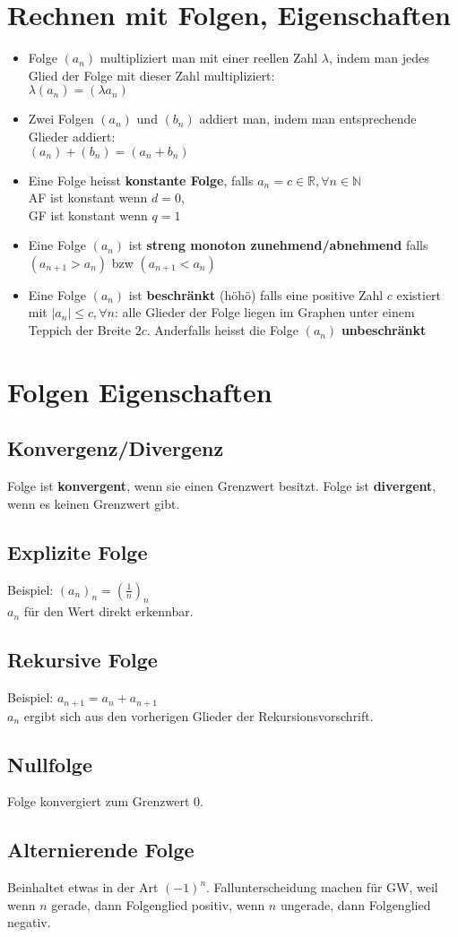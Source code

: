 \documentclass[../main.tex]{subfiles}
\begin{document}
\section{Rechnen mit Folgen, Eigenschaften}
\begin{itemize}
    \item Folge $(a_n)$ multipliziert man mit einer reellen Zahl $\lambda$, indem man jedes Glied der Folge mit dieser Zahl multipliziert: \\ [7pt]
    $\lambda(a_n) = (\lambda a_n)$
    \item Zwei Folgen $(a_n)$ und $(b_n)$ addiert man, indem man entsprechende Glieder addiert: \\ [7pt]
    $(a_n)+(b_n) = (a_n + b_n)$
    \item Eine Folge heisst \textbf{
        konstante Folge}, falls $a_n = c \in \mathbb{R}, \forall n \in \mathbb{N}$ \\
    AF ist konstant wenn $d=0$, \\
    GF ist konstant wenn $q=1$
    \item Eine Folge $(a_n)$ ist \textbf{streng monoton zunehmend/abnehmend} falls $(a_{n+1} > a_n)$ bzw $(a_{n+1} < a_n)$
    \item Eine Folge $(a_n)$ ist \textbf{beschränkt} (höhö) falls eine positive Zahl $c$ existiert mit $|a_n|\leq c, \forall n$: alle Glieder der Folge liegen im Graphen unter einem Teppich der Breite $2c$. Anderfalls heisst die Folge $(a_n)$ \textbf{unbeschränkt}
\end{itemize}


\section{Folgen Eigenschaften}
\subsection{Konvergenz/Divergenz}
Folge ist \textbf{konvergent}, wenn sie einen Grenzwert besitzt. Folge ist \textbf{divergent}, wenn es keinen 
Grenzwert gibt.

\subsection{Explizite Folge}
Beispiel: $(a_n)_n=(\frac{1}{n})_n$ \\
$a_n$ für den Wert direkt erkennbar.

\subsection{Rekursive Folge}
Beispiel: $a_{n+1}=a_n+a_{n+1}$ \\
$a_n$ ergibt sich aus den vorherigen Glieder der Rekursionsvorschrift.

\subsection{Nullfolge}
Folge konvergiert zum Grenzwert 0.

\subsection{Alternierende Folge}
Beinhaltet etwas in der Art $(-1)^n$. Fallunterscheidung machen für GW, weil wenn $n$ gerade, dann Folgenglied
positiv, wenn $n$ ungerade, dann Folgenglied negativ.
\end{document}
